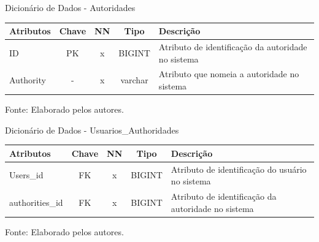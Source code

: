 \documentclass[
    12pt,               %
    openright,          %
    oneside,
    a4paper,            %
    BIBLATEX,           %
    TODO,               %
    english,            %
    brazil              %
    ]{ifsp-spo-inf-ctds}
\begin{document}
    \begin{center}
        \begin{quadro}[H]
        \centering
                \caption{Dicionário de Dados - Autoridades}
                  \begin{tabulary}{1.0\textwidth}{|p{9em}|c|c|c|p{19em}|}
            \hline
            Atributos & Chave & NN & Tipo & Descrição\\
            \hline
            ID & PK & x & BIGINT & Atributo de identificação da autoridade no sistema \\
            \hline
            Authority & - & x & varchar & Atributo que nomeia a autoridade no sistema\\
            \hline
            \end{tabulary}
                 
                \label{qd: md-authority}
                \centering
        {\footnotesize Fonte: Elaborado pelos autores.}
              \end{quadro}
            \end{center}

    \begin{center}
        \begin{quadro}[H]
        \centering
                \caption{Dicionário de Dados - Usuarios\_Authoridades}
                  \begin{tabulary}{1.0\textwidth}{|p{9em}|c|c|c|p{19em}|}
            \hline
            Atributos & Chave & NN & Tipo & Descrição\\
            \hline
            Users\_id & FK & x & BIGINT & Atributo de identificação do usuário no sistema \\
            \hline
            authorities\_id & FK & x & BIGINT & Atributo de identificação da autoridade no sistema\\
            \hline
            \end{tabulary}
                 
                \label{qd: md-usuarios-authorities}
                \centering
        {\footnotesize Fonte: Elaborado pelos autores.}
              \end{quadro}
            \end{center}
\end{document}
